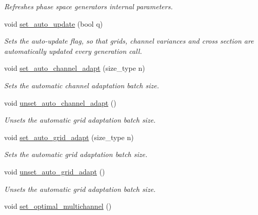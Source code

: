 \begin{DoxyCompactItemize}
\begin{DoxyCompactList}\small\item\em Refreshes phase space generator\textquotesingle{}s internal parameters. \end{DoxyCompactList}\item 
void \hyperlink{a00436_a225492c21d401713bb58fb9551743abf}{set\+\_\+auto\+\_\+update} (bool q)
\begin{DoxyCompactList}\small\item\em Sets the auto-\/update flag, so that grids, channel variances and cross section are automatically updated every generation call. \end{DoxyCompactList}\item 
void \hyperlink{a00436_aeb0b6fdf895af500c99f58638b6811be}{set\+\_\+auto\+\_\+channel\+\_\+adapt} (size\+\_\+type n)
\begin{DoxyCompactList}\small\item\em Sets the automatic channel adaptation batch size. \end{DoxyCompactList}\item 
\hypertarget{a00436_a3b52d1b0fa84e1c17ba0b65c5a6c4c2f}{}void \hyperlink{a00436_a3b52d1b0fa84e1c17ba0b65c5a6c4c2f}{unset\+\_\+auto\+\_\+channel\+\_\+adapt} ()\label{a00436_a3b52d1b0fa84e1c17ba0b65c5a6c4c2f}

\begin{DoxyCompactList}\small\item\em Unsets the automatic grid adaptation batch size. \end{DoxyCompactList}\item 
void \hyperlink{a00436_ad6007f69b82d4971795d5dcacc568fc2}{set\+\_\+auto\+\_\+grid\+\_\+adapt} (size\+\_\+type n)
\begin{DoxyCompactList}\small\item\em Sets the automatic grid adaptation batch size. \end{DoxyCompactList}\item 
\hypertarget{a00436_a43c7c3764692c4abd7ebe9cac264a213}{}void \hyperlink{a00436_a43c7c3764692c4abd7ebe9cac264a213}{unset\+\_\+auto\+\_\+grid\+\_\+adapt} ()\label{a00436_a43c7c3764692c4abd7ebe9cac264a213}

\begin{DoxyCompactList}\small\item\em Unsets the automatic grid adaptation batch size. \end{DoxyCompactList}\item 
\hypertarget{a00436_a5e12bf83f04600b41865655b67103e08}{}void \hyperlink{a00436_a5e12bf83f04600b41865655b67103e08}{set\+\_\+optimal\+\_\+multichannel} ()\label{a00436_a5e12bf83f04600b41865655b67103e08}


\end{DoxyCompactItemize}
